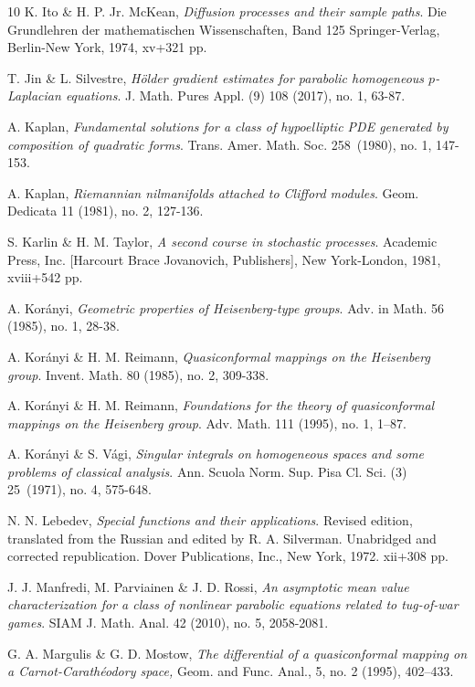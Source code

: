 \documentclass[11pt,a4paper]{amsart}
\numberwithin{equation}{section}
\numberwithin{equation}{section}
\begin{document}
\begin{thebibliography}{10}
K. Ito \& H. P. Jr. McKean, \emph{Diffusion processes and their sample paths}.
Die Grundlehren der mathematischen Wissenschaften, Band 125
Springer-Verlag, Berlin-New York, 1974, xv+321 pp.


T. Jin \& L. Silvestre,  \emph{H\"older gradient estimates for parabolic homogeneous  $p$-Laplacian equations}.
J. Math. Pures Appl. (9) 108 (2017), no. 1, 63-87.

A. Kaplan, \emph{Fundamental solutions for a class of hypoelliptic PDE generated by composition of quadratic forms}. Trans. Amer. Math. Soc. 258~(1980), no. 1, 147-153.

A. Kaplan, \emph{Riemannian nilmanifolds attached to Clifford modules}. Geom. Dedicata 11 (1981), no. 2, 127-136.

S. Karlin \& H. M. Taylor, \emph{A second course in stochastic processes}.
Academic Press, Inc. [Harcourt Brace Jovanovich, Publishers], New York-London, 1981, xviii+542 pp.

A. Kor\'anyi, \emph{Geometric properties of Heisenberg-type groups}. Adv. in Math. 56 (1985), no. 1, 28-38.


A. Kor\'anyi \& H. M. Reimann, \emph{Quasiconformal mappings on the Heisenberg group}. Invent. Math. 80 (1985), no. 2, 309-338.

A. Kor\'anyi \& H. M. Reimann, \emph{Foundations for the theory of quasiconformal mappings on the Heisenberg group}. Adv. Math. 111 (1995), no. 1, 1--87.



A. Kor\'anyi \& S. V\'agi, \emph{Singular integrals on homogeneous spaces and some problems of classical analysis}. 
Ann. Scuola Norm. Sup. Pisa Cl. Sci. (3) 25~(1971), no. 4, 575-648.


N. N. Lebedev, \emph{Special functions and their applications}. Revised edition, translated from the Russian and edited by R. A. Silverman. Unabridged and corrected republication. Dover Publications, Inc., New York, 1972. xii+308 pp.


J. J. Manfredi, M. Parviainen \& J. D. Rossi, \emph{An asymptotic mean value characterization for a class of nonlinear parabolic equations related to tug-of-war games}.
SIAM J. Math. Anal. 42 (2010), no. 5, 2058-2081.

 G. A. Margulis  \& G. D. Mostow,
{\em The differential of a quasiconformal mapping on
a Carnot-Carath\'eodory space,\/} Geom. and Func. Anal., 5, no. 2 (1995), 402--433.


\end{thebibliography}
\end{document}
